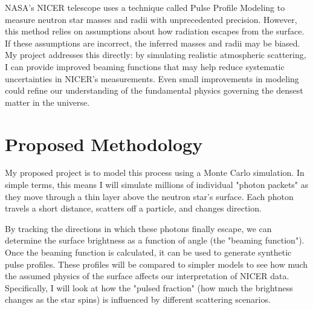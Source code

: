 \documentclass[11pt]{article}
\begin{document}
NASA's NICER telescope uses a technique called Pulse Profile Modeling to measure neutron star masses and radii with unprecedented precision. However, this method relies on assumptions about how radiation escapes from the surface. If these assumptions are incorrect, the inferred masses and radii may be biased. My project addresses this directly: by simulating realistic atmospheric scattering, I can provide improved beaming functions that may help reduce systematic uncertainties in NICER's measurements. Even small improvements in modeling could refine our understanding of the fundamental physics governing the densest matter in the universe.

\section*{Proposed Methodology}
My proposed project is to model this process using a Monte Carlo simulation. In simple terms, this means I will simulate millions of individual "photon packets" as they move through a thin layer above the neutron star's surface. Each photon travels a short distance, scatters off a particle, and changes direction.

By tracking the directions in which these photons finally escape, we can determine the surface brightness as a function of angle (the "beaming function"). Once the beaming function is calculated, it can be used to generate synthetic pulse profiles. These profiles will be compared to simpler models to see how much the assumed physics of the surface affects our interpretation of NICER data. Specifically, I will look at how the "pulsed fraction" (how much the brightness changes as the star spins) is influenced by different scattering scenarios.
\end{document}
